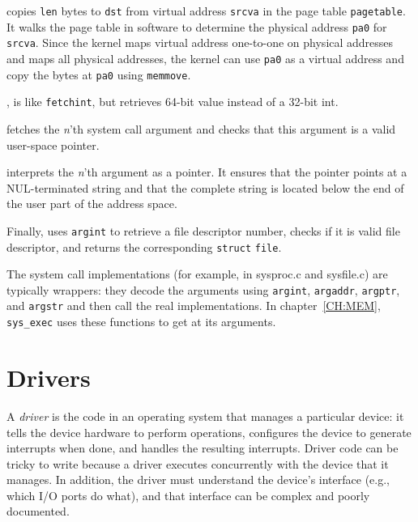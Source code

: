  copies \lstinline{len} bytes to
\lstinline{dst} from virtual address \lstinline{srcva} in the page
table \lstinline{pagetable}.  It walks the page table in software to
determine the physical address \lstinline{pa0} for \lstinline{srcva}.
Since the kernel maps virtual address one-to-one on physical
addresses and maps all physical addresses, the kernel can use
\lstinline{pa0} as a virtual address and copy the bytes at
\lstinline{pa0} using \lstinline{memmove}.

,
is like
\lstinline{fetchint},
but retrieves 64-bit value instead of a 32-bit int.

fetches the
\textit{n}'th 
system call argument and checks that this argument is a valid
user-space pointer.

interprets the
\textit{n}'th 
argument as a pointer.  It ensures that the pointer points at a
NUL-terminated string and that the complete string is located below
the end of the user part of the address space.

Finally,
uses
\lstinline{argint}
to retrieve a file descriptor number, checks if it is valid
file descriptor, and returns the corresponding
\lstinline{struct}
\lstinline{file}.

The system call implementations (for example, in sysproc.c and sysfile.c)
are typically wrappers: they decode the arguments using 
\lstinline{argint},
\lstinline{argaddr},
\lstinline{argptr}, 
and 
\lstinline{argstr}
and then call the real implementations.
In chapter~\ref{CH:MEM},
\lstinline{sys_exec}
uses these functions to get at its arguments.

\section{Drivers}

A
\textit{driver}
is the code in an operating system that manages a particular device:
it tells the device hardware to perform operations,
configures the device to generate interrupts when done,
and handles the resulting interrupts.
Driver code can be tricky to write
because a driver executes concurrently with the device that it manages.  In
addition, the driver must understand the device's interface (e.g., which I/O
ports do what), and that interface can be complex and poorly documented.

